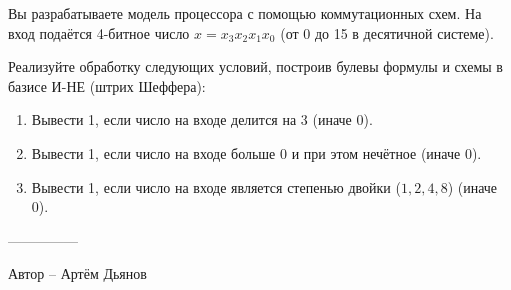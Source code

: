 \question
Вы разрабатываете модель процессора с помощью коммутационных схем. На вход подаётся 4-битное число $x=x_3x_2x_1x_0$ (от 0 до 15 в десятичной системе).

Реализуйте обработку следующих условий, построив булевы формулы и схемы в базисе И-НЕ (штрих Шеффера):
\begin{enumerate}
\item Вывести 1, если число на входе делится на 3 (иначе 0).
\item Вывести 1, если число на входе больше 0 и при этом нечётное (иначе 0).
\item Вывести 1, если число на входе является степенью двойки ($1,2,4,8$) (иначе 0).
\end{enumerate}

---------------

Автор -- Артём Дьянов
